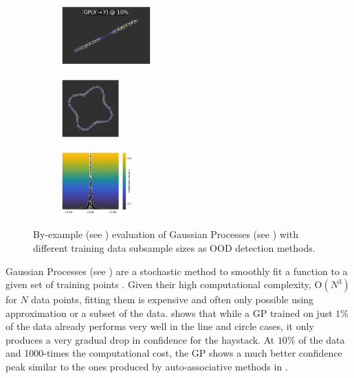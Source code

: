 \begin{figure}[H]
    \begin{subfigure}
        \centering
        \includegraphics[width=0.388\textwidth,valign=t]{ood-detection/figures/ood-detection/confidence-line-gp.pdf}
    \end{subfigure}
    \begin{subfigure}
        \centering
        \includegraphics[width=0.254\textwidth,valign=t]{ood-detection/figures/ood-detection/confidence-circle-gp.pdf}
    \end{subfigure}
    \begin{subfigure}
        \centering
        \includegraphics[width=0.308\textwidth,valign=t]{ood-detection/figures/ood-detection/confidence-haystack-gp.pdf}
    \end{subfigure}

    \caption[Gaussian Process uncertainty for OOD detection]{By-example (see ) evaluation of Gaussian Processes (see ) with different training data subsample sizes as OOD detection methods.}
    \label{fig:uq-gp-ood-detection}
\end{figure}

\noindent Gaussian Processes (see ) are a stochastic method to smoothly fit a function to a given set of training points \cite{gp-ml-2005}. Given their high computational complexity, $\text{O}(N^3)$ for $N$ data points, fitting them is expensive and often only possible using approximation or a subset of the data.  shows that while a GP trained on just $1\%$ of the data already performs very well in the line and circle cases, it only produces a very gradual drop in confidence for the haystack. At $10\%$ of the data and 1000-times the computational cost, the GP shows a much better confidence peak similar to the ones produced by auto-associative methods in .

